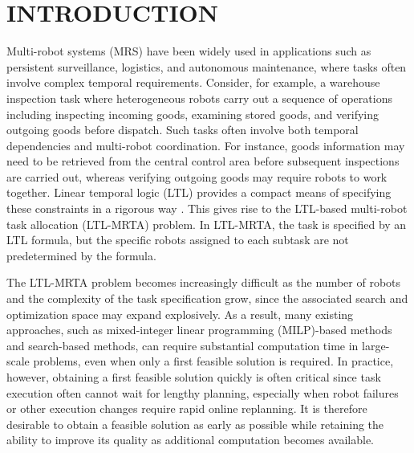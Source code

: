 \documentclass[lettersize,journal]{IEEEtran}
\theoremstyle{italiclemma}
\theoremstyle{italiclemma}
\theoremstyle{definition}
\begin{document}
\section{INTRODUCTION}
Multi-robot systems (MRS) have been widely used in applications such as persistent surveillance\cite{leahy2016persistent}, logistics\cite{LiRAL23}, and autonomous maintenance\cite{liu2024time}, where tasks often involve complex temporal requirements. Consider, for example, a warehouse inspection task where heterogeneous robots carry out a sequence of operations including inspecting incoming goods, examining stored goods, and verifying outgoing goods before dispatch. Such tasks often involve both temporal dependencies and multi-robot coordination. For instance, goods information may need to be retrieved from the central control area before subsequent inspections are carried out, whereas verifying outgoing goods may require robots to work together. Linear temporal logic (LTL) provides a compact means of specifying these constraints in a rigorous way \cite{baier2008principles,schillinger2018decomposition,11627658}. This gives rise to the LTL-based multi-robot task allocation (LTL-MRTA) problem. In LTL-MRTA, the task is specified by an LTL formula, but the specific robots assigned to each subtask are not predetermined by the formula\cite{luo2022temporal}.

 The LTL-MRTA problem becomes increasingly difficult as the number of robots and the complexity of the task specification grow, since the associated search and optimization space may expand explosively. As a result, many existing approaches, such as  mixed-integer linear programming (MILP)-based methods\cite{luo2022temporal, 9663414} and  search-based methods\cite{ulusoy2013optimality, kantaros2020stylus}, can require substantial computation time in large-scale problems, even when only a first feasible solution is required. In practice, however, obtaining a first feasible solution quickly is often critical since task execution often cannot wait for lengthy planning, especially when robot failures or other execution changes require rapid online replanning. It is therefore desirable to obtain a feasible solution as early as possible while retaining the ability to improve its quality as additional computation becomes available.
\end{document}
